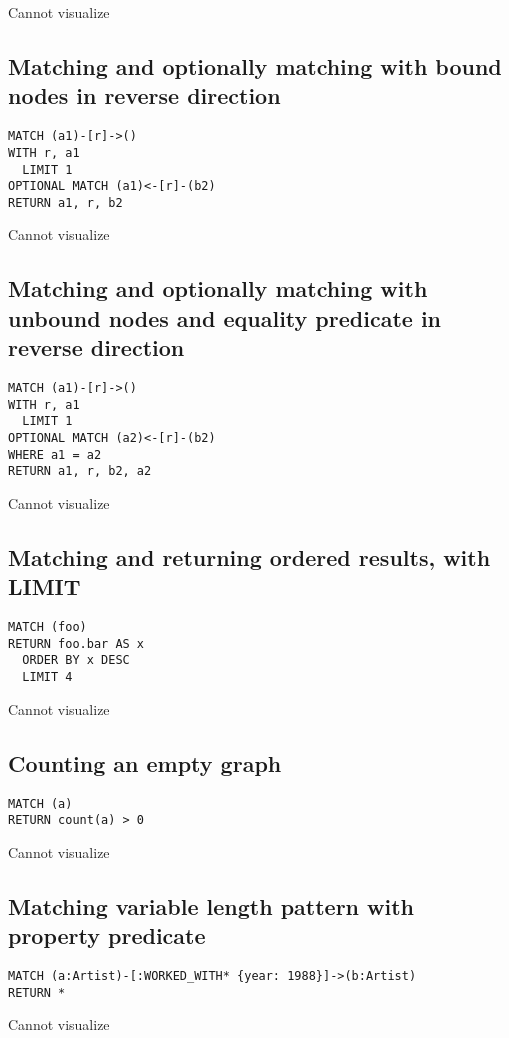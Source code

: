 Cannot visualize
\subsection{Matching and optionally matching with bound nodes in reverse direction}

\begin{lstlisting}
MATCH (a1)-[r]->()
WITH r, a1
  LIMIT 1
OPTIONAL MATCH (a1)<-[r]-(b2)
RETURN a1, r, b2
\end{lstlisting}

Cannot visualize
\subsection{Matching and optionally matching with unbound nodes and equality predicate in reverse direction}

\begin{lstlisting}
MATCH (a1)-[r]->()
WITH r, a1
  LIMIT 1
OPTIONAL MATCH (a2)<-[r]-(b2)
WHERE a1 = a2
RETURN a1, r, b2, a2
\end{lstlisting}

Cannot visualize
\subsection{Matching and returning ordered results, with LIMIT}

\begin{lstlisting}
MATCH (foo)
RETURN foo.bar AS x
  ORDER BY x DESC
  LIMIT 4
\end{lstlisting}

Cannot visualize
\subsection{Counting an empty graph}

\begin{lstlisting}
MATCH (a)
RETURN count(a) > 0
\end{lstlisting}

Cannot visualize
\subsection{Matching variable length pattern with property predicate}

\begin{lstlisting}
MATCH (a:Artist)-[:WORKED_WITH* {year: 1988}]->(b:Artist)
RETURN *
\end{lstlisting}

Cannot visualize
